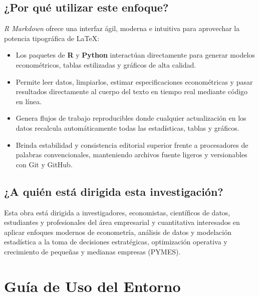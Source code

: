 \documentclass[a4paper, nobind]{templates/ociamthesis}
\providecommand{\tightlist}{%
  \setlength{\itemsep}{0pt}\setlength{\parskip}{0pt}}
\begin{document}
\section*{¿Por qué utilizar este enfoque?}\label{por-quuxe9-utilizar-este-enfoque}

\emph{R Markdown} ofrece una interfaz ágil, moderna e intuitiva para aprovechar la potencia tipográfica de LaTeX:

\begin{itemize}
\tightlist
\item
  Los paquetes de \textbf{R} y \textbf{Python} interactúan directamente para generar modelos econométricos, tablas estilizadas y gráficos de alta calidad.
\item
  Permite leer datos, limpiarlos, estimar especificaciones econométricas y pasar resultados directamente al cuerpo del texto en tiempo real mediante código en línea.
\item
  Genera flujos de trabajo reproducibles donde cualquier actualización en los datos recalcula automáticamente todas las estadísticas, tablas y gráficos.
\item
  Brinda estabilidad y consistencia editorial superior frente a procesadores de palabras convencionales, manteniendo archivos fuente ligeros y versionables con Git y GitHub.
\end{itemize}

\section*{¿A quién está dirigida esta investigación?}\label{a-quiuxe9n-estuxe1-dirigida-esta-investigaciuxf3n}

Esta obra está dirigida a investigadores, economistas, científicos de datos, estudiantes y profesionales del área empresarial y cuantitativa interesados en aplicar enfoques modernos de econometría, análisis de datos y modelación estadística a la toma de decisiones estratégicas, optimización operativa y crecimiento de pequeñas y medianas empresas (PYMES).

\chapter{Guía de Uso del Entorno}\label{guuxeda-de-uso-del-entorno}

\minitoc 
\end{document}
